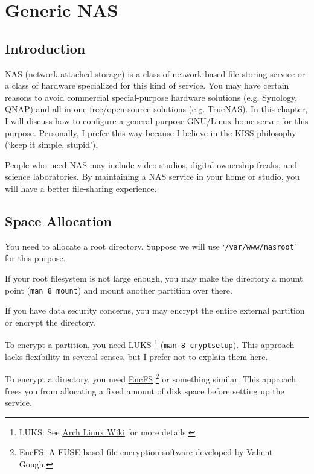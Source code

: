 \chapter{Generic NAS}



\section{Introduction}

NAS (network-attached storage) is a class of network-based file storing service or a class of hardware specialized for this kind of service.
You may have certain reasons to avoid commercial special-purpose hardware solutions (e.g. Synology, QNAP)
and all-in-one free/open-source solutions (e.g. TrueNAS).
In this chapter, I will discuss how to configure a general-purpose GNU/Linux home server for this purpose.
Personally, I prefer this way because I believe in the KISS philosophy (`keep it simple, stupid').

People who need NAS may include video studios, digital ownership freaks, and science laboratories.
By maintaining a NAS service in your home or studio, you will have a better file-sharing experience.



\section{Space Allocation}

You need to allocate a root directory. Suppose we will use `\texttt{/var/www/nasroot}' for this purpose.

If your root filesystem is not large enough, you may make the directory a mount point (\texttt{man 8 mount})
and mount another partition over there.

If you have data security concerns, you may encrypt the entire external partition or encrypt the directory.

To encrypt a partition, you need LUKS
\footnote{LUKS: See \href{https://wiki.archlinux.org/title/Dm-crypt/Encrypting_a_non-root_file_system}{Arch Linux Wiki} for more details.}
(\texttt{man 8 cryptsetup}).
This approach lacks flexibility in several senses, but I prefer not to explain them here.

To encrypt a directory, you need \href{https://github.com/vgough/encfs}{EncFS}
\footnote{EncFS: A FUSE-based file encryption software developed by Valient Gough.} or something similar.
This approach frees you from allocating a fixed amount of disk space before setting up the service.



